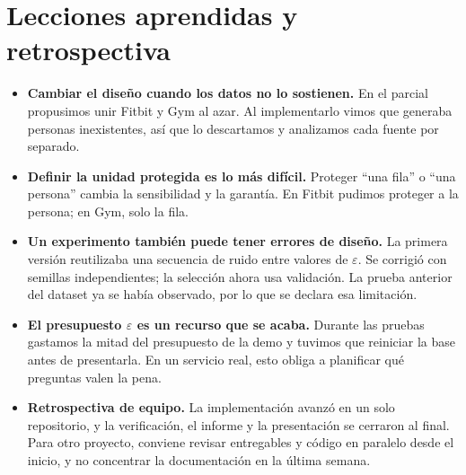 \documentclass[11pt]{article}
\begin{document}
\section{Lecciones aprendidas y retrospectiva}
\label{sec:lecciones}
\begin{itemize}[nosep]
  \item \textbf{Cambiar el diseño cuando los datos no lo sostienen.} En el parcial propusimos unir Fitbit y Gym al azar. Al implementarlo vimos que generaba personas inexistentes, así que lo descartamos y analizamos cada fuente por separado.
  \item \textbf{Definir la unidad protegida es lo más difícil.} Proteger ``una fila'' o ``una persona'' cambia la sensibilidad y la garantía. En Fitbit pudimos proteger a la persona; en Gym, solo la fila.
  \item \textbf{Un experimento también puede tener errores de diseño.} La primera versión reutilizaba una secuencia de ruido entre valores de $\varepsilon$. Se corrigió con semillas independientes; la selección ahora usa validación. La prueba anterior del dataset ya se había observado, por lo que se declara esa limitación.
  \item \textbf{El presupuesto $\varepsilon$ es un recurso que se acaba.} Durante las pruebas gastamos la mitad del presupuesto de la demo y tuvimos que reiniciar la base antes de presentarla. En un servicio real, esto obliga a planificar qué preguntas valen la pena.
  \item \textbf{Retrospectiva de equipo.} La implementación avanzó en un solo repositorio, y la verificación, el informe y la presentación se cerraron al final. Para otro proyecto, conviene revisar entregables y código en paralelo desde el inicio, y no concentrar la documentación en la última semana.
\end{itemize}
\end{document}
